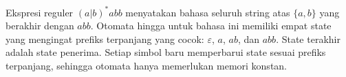 \begin{contoh}
Ekspresi reguler \((a|b)^{*}abb\) menyatakan bahasa seluruh string
atas \(\{a,b\}\) yang berakhir dengan \(abb\). Otomata hingga untuk
bahasa ini memiliki empat state yang mengingat prefiks terpanjang
yang cocok: \(\varepsilon\), \(a\), \(ab\), dan \(abb\). State
terakhir adalah state penerima. Setiap simbol baru memperbarui state
sesuai prefiks terpanjang, sehingga otomata hanya memerlukan memori
konstan.
\end{contoh}
